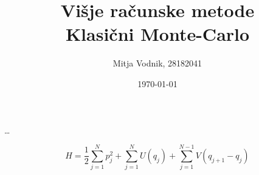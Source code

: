 \documentclass[a4paper]{article}
\newcommand{\half}{\frac{1}{2}}
\begin{document}
    \title{\sc\large Višje računske metode\\
		\bigskip
		\bf\Large Klasični Monte-Carlo}
	\author{Mitja Vodnik, 28182041}
	\date{\today}
	\maketitle

    \ldots

    \begin{equation}\label{eq1}
        H = \half \sum_{j=1}^{N} p_j^2 + \sum_{j=1}^N U(q_j) + \sum_{j=1}^{N-1} V(q_{j+1} - q_j)
    \end{equation}

    \iffalse
    \begin{figure}
        \centering
        \texttt{[image: slika16.pdf]}
        \caption{Odvisnost toka $J$ med termostatom in verigo v odvisnosti od časa vzorčenja $\tau$.
        Računano je na anharmonski ($\lambda = 1$) verigi dolžine $N = 10$ in povprečeno po $1000$ vzorcih.
        $J_1$ se nanaša na tok na levi, $J_2$ pa na desni strani verige.}
        \label{slika6}
    \end{figure}
    \fi
\end{document}
